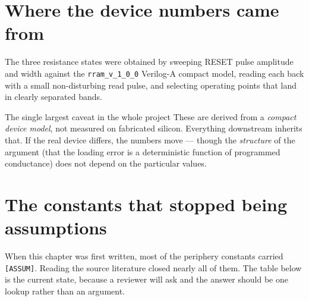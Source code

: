 \documentclass[11pt,a4paper]{report}
\begin{document}
\section{Where the device numbers came from}

The three resistance states were obtained by sweeping RESET pulse amplitude
and width against the \texttt{rram\_v\_1\_0\_0} Verilog-A compact model,
reading each back with a small non-disturbing read pulse, and selecting
operating points that land in clearly separated bands.

\begin{warnbox}{The single largest caveat in the whole project}
These are derived from a \emph{compact device model}, not measured on
fabricated silicon. Everything downstream inherits that. If the real device
differs, the numbers move --- though the \emph{structure} of the argument
(that the loading error is a deterministic function of programmed
conductance) does not depend on the particular values.
\end{warnbox}

\section{The constants that stopped being assumptions}

When this chapter was first written, most of the periphery constants carried
\texttt{[ASSUM]}. Reading the source literature closed nearly all of them. The
table below is the current state, because a reviewer will ask and the answer
should be one lookup rather than an argument.
\end{document}
